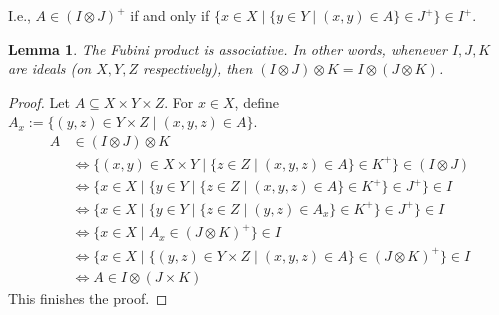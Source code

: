 \documentclass[a4paper]{amsart}
\theoremstyle{definition}
\theoremstyle{remark}
\theoremstyle{plain}
\newtheorem{mylem}[mydef]{Lemma}
\numberwithin{mydef}{section}
\begin{document}
	I.e., $A\in (I\otimes J)^+$ if and only if $\{x\in X\;|\;\{y\in Y\;|\;(x,y)\in A\}\in J^+\}\in I^+$.
	
	\begin{mylem}\label{FubiniAssociative}
		The Fubini product is associative. In other words, whenever $I,J,K$ are ideals (on $X,Y,Z$ respectively), then $(I\otimes J)\otimes K=I\otimes(J\otimes K)$.
	\end{mylem}
	
	\begin{proof}
		Let $A\subseteq X\times Y\times Z$. For $x\in X$, define $A_x:=\{(y,z)\in Y\times Z\;|\;(x,y,z)\in A\}$.
		\begin{align*}
			A & \in (I\otimes J)\otimes K \\
			& \Leftrightarrow \{(x,y)\in X\times Y\;|\;\{z\in Z\;|\;(x,y,z)\in A\}\in K^+\}\in (I\otimes J) \\
			& \Leftrightarrow \{x\in X\;|\;\{y\in Y\;|\;\{z\in Z\;|\;(x,y,z)\in A\}\in K^+\}\in J^+\}\in I \\
			& \Leftrightarrow \{x\in X\;|\;\{y\in Y\;|\;\{z\in Z\;|\;(y,z)\in A_x\}\in K^+\}\in J^+\}\in I \\
			& \Leftrightarrow \{x\in X\;|\;A_x\in(J\otimes K)^+\}\in I \\
			& \Leftrightarrow \{x\in X\;|\;\{(y,z)\in Y\times Z\;|\;(x,y,z)\in A\}\in(J\otimes K)^+\}\in I \\
			& \Leftrightarrow A\in I\otimes(J\times K)
		\end{align*}
		This finishes the proof.

		
	\end{proof}
	
\end{document}
